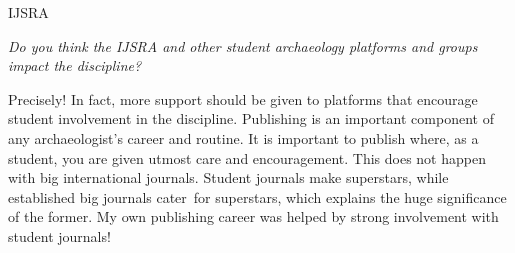 \begin{labeling}{IJSRA}
\item[IJSRA] \emph{Do you think the IJSRA and other student archaeology platforms and groups impact the discipline?}
	
\item[SC] Precisely! In fact, more support should be given to platforms that encourage student involvement in the discipline. Publishing is an important component of any archaeologist’s career and routine. It is important to publish where, as a student, you are given utmost care and encouragement. This does not happen with big international journals. Student journals make superstars, while established big journals cater for superstars, which explains the huge significance of the former. My own publishing career was helped by strong involvement with student journals!
\end{labeling}


